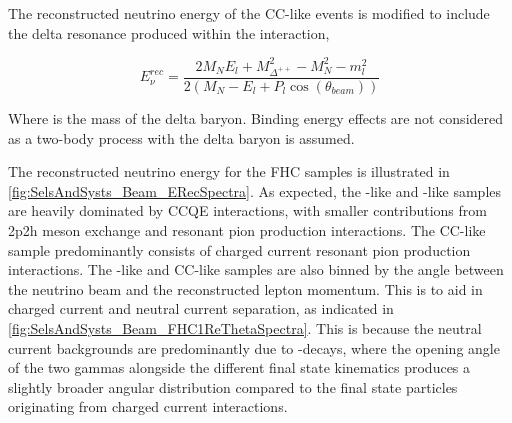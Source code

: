 The reconstructed neutrino energy of the CC\quickmath{1\pi^{+}}-like events is modified to include the delta resonance produced within the interaction,

\begin{equation}
  \label{sec:SelsAndSysts_Erec_CCRES}
  E^{rec}_{\nu} = \frac{2M_{N}E_{l} + M_{\Delta^{++}}^{2} - M_{N}^{2} - m_{l}^{2}}{2(M_{N} - E_{l} + P_{l}\cos(\theta_{beam}))}
\end{equation}

Where  is the mass of the delta baryon. Binding energy effects are not considered as a two-body process with the delta baryon is assumed. 

The reconstructed neutrino energy for the FHC samples is illustrated in \autoref{fig:SelsAndSysts_Beam_ERecSpectra}. As expected, the -like and -like samples are heavily dominated by CCQE interactions, with smaller contributions from 2p2h meson exchange and resonant pion production interactions. The CC\quickmath{1\pi^{+}}-like sample predominantly consists of charged current resonant pion production interactions. The -like and CC\quickmath{1\pi^{+}}-like samples are also binned by the angle between the neutrino beam and the reconstructed lepton momentum. This is to aid in charged current and neutral current separation, as indicated in \autoref{fig:SelsAndSysts_Beam_FHC1ReThetaSpectra}. This is because the neutral current backgrounds are predominantly due to -decays, where the opening angle of the two gammas alongside the different final state kinematics produces a slightly broader angular distribution compared to the final state particles originating from charged current  interactions.


